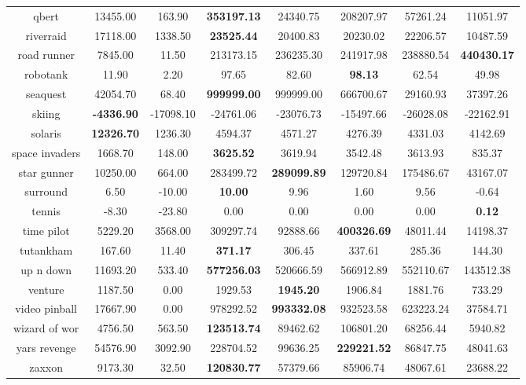 \documentclass{article}
\begin{document}
\begin{table}[ht]
\begin{tabular}{|c|c|c|c|c|c|c|c|}
 qbert & 13455.00 & 163.90 & \bf{353197.13} & 24340.75 & 208207.97 & 57261.24 & 11051.97 \\
 riverraid & 17118.00 & 1338.50 & \bf{23525.44} & 20400.83 & 20230.02 & 22206.57 & 10487.59 \\
 road runner & 7845.00 & 11.50 & 213173.15 & 236235.30 & 241917.98 & 238880.54 & \bf{440430.17} \\
 robotank & 11.90 & 2.20 & 97.65 & 82.60 & \bf{98.13} & 62.54 & 49.98 \\
 seaquest & 42054.70 & 68.40 & \bf{999999.00} & 999999.00 & 666700.67 & 29160.93 & 37397.26 \\
 skiing & \bf{-4336.90} & -17098.10 & -24761.06 & -23076.73 & -15497.66 & -26028.08 & -22162.91 \\
 solaris & \bf{12326.70} & 1236.30 & 4594.37 & 4571.27 & 4276.39 & 4331.03 & 4142.69 \\
 space invaders & 1668.70 & 148.00 & \bf{3625.52} & 3619.94 & 3542.48 & 3613.93 & 835.37 \\
 star gunner & 10250.00 & 664.00 & 283499.72 & \bf{289099.89} & 129720.84 & 175486.67 & 43167.07 \\
 surround & 6.50 & -10.00 & \bf{10.00} & 9.96 & 1.60 & 9.56 & -0.64 \\
 tennis & -8.30 & -23.80 & 0.00 & 0.00 & 0.00 & 0.00 & \bf{0.12} \\
 time pilot & 5229.20 & 3568.00 & 309297.74 & 92888.66 & \bf{400326.69} & 48011.44 & 14198.37 \\
 tutankham & 167.60 & 11.40 & \bf{371.17} & 306.45 & 337.61 & 285.36 & 144.30 \\
 up n down & 11693.20 & 533.40 & \bf{577256.03} & 520666.59 & 566912.89 & 552110.67 & 143512.38 \\
 venture & 1187.50 & 0.00 & 1929.53 & \bf{1945.20} & 1906.84 & 1881.76 & 733.29 \\
 video pinball & 17667.90 & 0.00 & 978292.52 & \bf{993332.08} & 932523.58 & 623223.24 & 37584.71 \\
 wizard of wor & 4756.50 & 563.50 & \bf{123513.74} & 89462.62 & 106801.20 & 68256.44 & 5940.82 \\
 yars revenge & 54576.90 & 3092.90 & 228704.52 & 99636.25 & \bf{229221.52} & 86847.75 & 48041.63 \\
 zaxxon & 9173.30 & 32.50 & \bf{120830.77} & 57379.66 & 85906.74 & 48067.61 & 23688.22 \\
\hline
\end{tabular}
\end{table}
\normalsize







 
\end{document}
